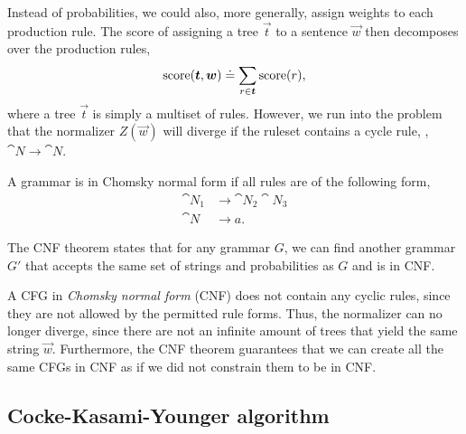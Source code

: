 Instead of probabilities, we could also, more generally, assign weights to each
production rule. The score of assigning a tree $\vec{t}$ to a sentence
$\vec{w}$ then decomposes over the production rules, \[
  \mathrm{score}(\bm{t},\bm{w}) \doteq \sum_{r\in\bm{t}} \mathrm{score}(r)
,\]
where a tree $\vec{t}$ is simply a multiset of rules. However, we run into the
problem that the normalizer $Z(\vec{w})$ will diverge if the ruleset contains a
cycle rule, \eg, $\cat{N}\to\cat{N}$.

\begin{definition}

  A grammar is in Chomsky normal form if all rules are of the following form,
  \begin{align*}
    \cat{N}_1 &\to \cat{N}_2 \cat{N}_3 \\
    \cat{N} &\to a
  .\end{align*}
\end{definition}

\begin{theorem}
  The CNF theorem states that for any grammar $G$, we can find another
  grammar $G'$ that accepts the same set of strings and probabilities as $G$
  and is in CNF.
\end{theorem}

A CFG in \textit{Chomsky normal form} (CNF) does not contain any cyclic rules,
since they are not allowed by the permitted rule forms. Thus, the normalizer
can no longer diverge, since there are not an infinite amount of trees that
yield the same string $\vec{w}$. Furthermore, the CNF theorem guarantees that
we can create all the same CFGs in CNF as if we did not constrain them to be in
CNF.

\subsection{Cocke-Kasami-Younger algorithm}

